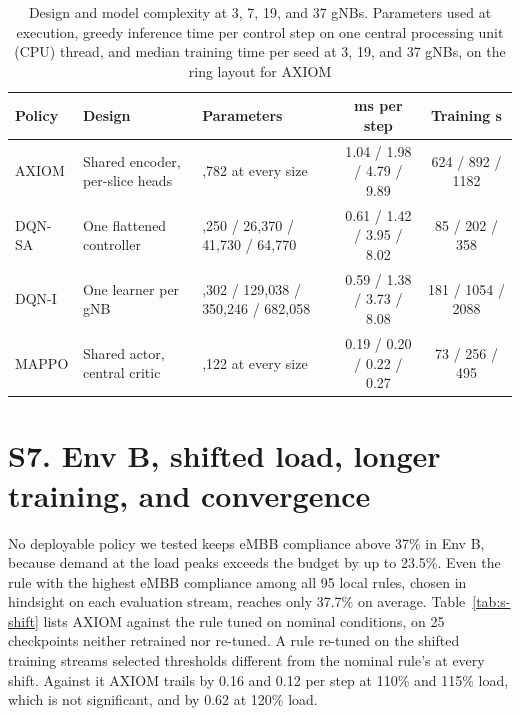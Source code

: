 \documentclass[9pt]{extarticle}
\begin{document}
\begin{table}[!b]
\caption{Design and model complexity at 3, 7, 19, and 37 gNBs. Parameters used at execution, greedy inference time per control step on one central processing unit (CPU) thread, and median training time per seed at 3, 19, and 37 gNBs, on the ring layout for AXIOM}
\label{tab:complexity}
\centering
\scriptsize
{\setlength{\tabcolsep}{4pt}
\begin{tabular}{@{}l>{\raggedright\arraybackslash}p{74pt}>{\centering\arraybackslash}p{80pt}cc@{}}
\toprule
Policy & Design & Parameters & ms per step & Training s \\
\midrule
AXIOM & Shared encoder, per-slice heads & 7,782 at every size & 1.04 / 1.98 / 4.79 / 9.89 & 624 / 892 / 1182 \\
DQN-SA & One flattened controller & 21,250 / 26,370 / 41,730 / 64,770 & 0.61 / 1.42 / 3.95 / 8.02 & 85 / 202 / 358 \\
DQN-I & One learner per gNB & 55,302 / 129,038 / 350,246 / 682,058 & 0.59 / 1.38 / 3.73 / 8.08 & 181 / 1054 / 2088 \\
MAPPO & Shared actor, central critic & 5,122 at every size & 0.19 / 0.20 / 0.22 / 0.27 & 73 / 256 / 495 \\
\bottomrule
\end{tabular}}
\end{table}

\section*{S7. Env B, shifted load, longer training, and convergence}
No deployable policy we tested keeps eMBB compliance above 37\% in Env B, because demand at the load peaks exceeds the budget by up to 23.5\%. Even the rule with the highest eMBB compliance among all 95 local rules, chosen in hindsight on each evaluation stream, reaches only 37.7\% on average. Table~\ref{tab:s-shift} lists AXIOM against the rule tuned on nominal conditions, on 25 checkpoints neither retrained nor re-tuned. A rule re-tuned on the shifted training streams selected thresholds different from the nominal rule's at every shift. Against it AXIOM trails by 0.16 and 0.12 per step at 110\% and 115\% load, which is not significant, and by 0.62 at 120\% load.
\end{document}
